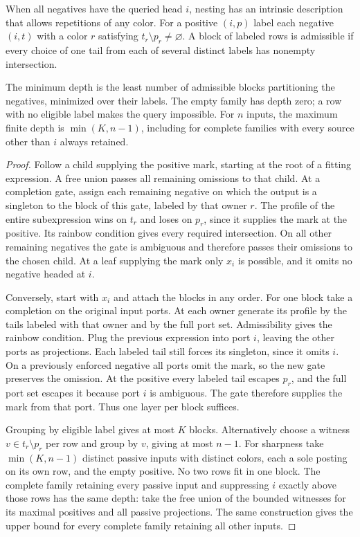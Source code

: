 When all negatives have the queried head $i$, nesting has an intrinsic
description that allows repetitions of any color. For a positive $(i,p)$
label each negative $(i,t)$ with a color $r$ satisfying
$t_r\setminus p_r\ne\varnothing$. A block of labeled rows is admissible
if every choice of one tail from each of several distinct labels has
nonempty intersection.

\begin{theorem}\label{core:thm:one-source-depth}
The minimum depth is the least number of admissible blocks partitioning
the negatives, minimized over their labels. The empty family has depth
zero; a row with no eligible label makes the query impossible. For
$n$ inputs, the maximum finite depth is $\min(K,n-1)$, including for
complete families with every source other than $i$ always retained.
\end{theorem}
\begin{proof}
Follow a child supplying the positive mark, starting at the root of a
fitting expression. A free union passes all remaining omissions to
that child. At a completion gate, assign each remaining negative on
which the output is a singleton to the block of this gate, labeled
by that owner $r$. The profile of the entire subexpression wins on
$t_r$ and loses on $p_r$, since it supplies the mark at the positive.
Its rainbow condition gives every required intersection. On all other
remaining negatives the gate is ambiguous and therefore passes their
omissions to the chosen child. At a leaf supplying the mark only
$x_i$ is possible, and it omits no negative headed at $i$.

Conversely, start with $x_i$ and attach the blocks in any order.
For one block take a completion on the original input ports. At each
owner generate its profile by the tails labeled with that owner and
by the full port set. Admissibility gives the rainbow condition. Plug
the previous expression into port $i$, leaving the other ports as
projections. Each labeled tail still forces its singleton, since it
omits $i$. On a previously enforced negative all ports omit the mark,
so the new gate preserves the omission. At the positive every labeled tail escapes $p_r$, and the full
port set escapes it because port $i$ is ambiguous. The gate therefore
supplies the mark from that port. Thus one layer per block suffices.

Grouping by eligible label gives at most $K$ blocks. Alternatively
choose a witness $v\in t_r\setminus p_r$ per row and group by $v$,
giving at most $n-1$. For sharpness take $\min(K,n-1)$ distinct
passive inputs with distinct colors, each a sole posting on its own
row, and the empty positive. No two rows fit in one block.
The complete family retaining every passive input and suppressing $i$
exactly above those rows has the same depth: take the free union of
the bounded witnesses for its maximal positives and all passive
projections. The same construction gives the upper bound for every
complete family retaining all other inputs.
\end{proof}

